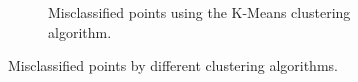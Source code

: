 \documentclass[a4paper,12pt]{report}
\begin{document}
\begin{figure}[H]
\begin{subfigure}[b]{0.8\textwidth}
        \caption{Misclassified points using the K-Means clustering algorithm.}
    \end{subfigure}
    \caption{Misclassified points by different clustering algorithms.}
\end{figure}















\end{document}
